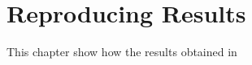 \chapter{Reproducing Results}
\label{ch:reproduce}

This chapter show how the results obtained in 



















